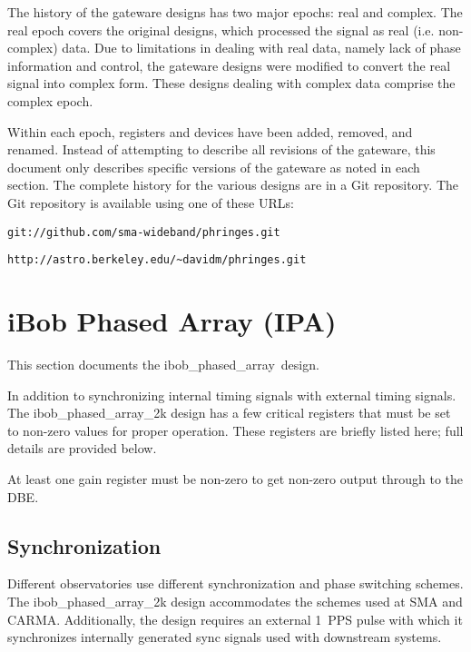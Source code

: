\documentclass[12pt]{article}
\begin{document}
The history of the gateware designs has two major epochs: real and complex.
The real epoch covers the original designs, which processed the signal as real
(i.e. non-complex) data.  Due to limitations in dealing with real data, namely
lack of phase information and control, the gateware designs were modified to
convert the real signal into complex form.  These designs dealing with complex
data comprise the complex epoch.

Within each epoch, registers and devices have been added, removed, and renamed.
Instead of attempting to describe all revisions of the gateware, this document
only describes specific versions of the gateware as noted in each section.  The
complete history for the various designs are in a Git repository.  The
Git repository is available using one of these URLs:

\begin{center}
\nolinkurl{git://github.com/sma-wideband/phringes.git}
\end{center}

\begin{center}
\nolinkurl{http://astro.berkeley.edu/~davidm/phringes.git}
\end{center}

\newpage
\section{iBob Phased Array (IPA)}

This section documents the ibob\_phased\_array\ipaver\ design.

In addition to synchronizing internal timing signals with external timing
signals.  The ibob\_phased\_array\_2k design has a few critical registers that
must be set to non-zero values for proper operation.  These registers are
briefly listed here; full details are provided below.

\begin{description}
 At least one gain register must be non-zero to get
non-zero output through to the DBE.
\end{description}

  \subsection{Synchronization}

Different observatories use different synchronization and phase switching
schemes.  The ibob\_phased\_array\_2k design accommodates the schemes used at
SMA and CARMA.  Additionally, the design requires an external 1~PPS pulse with
which it synchronizes internally generated sync signals used with downstream
systems.
\end{document}
